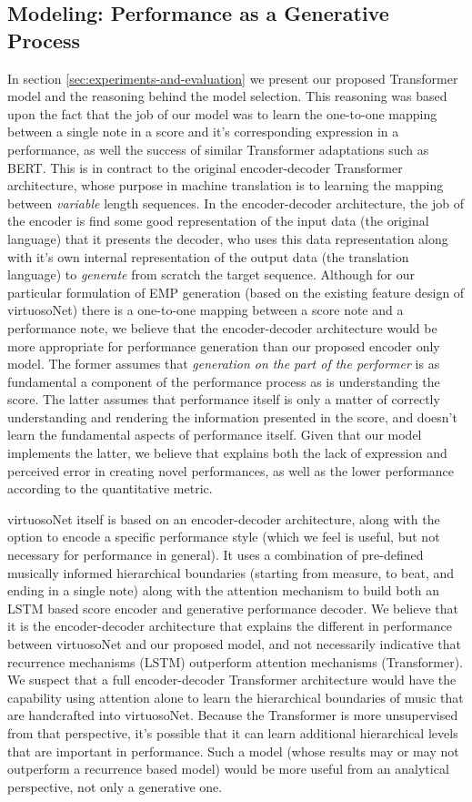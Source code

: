 \subsection{Modeling: Performance as a Generative Process}
In section \ref{sec:experiments-and-evaluation} we present our proposed Transformer model and the reasoning behind the model selection. This reasoning was based upon the fact that the job of our model was to learn the one-to-one mapping between a single note in a score and it's corresponding expression in a performance, as well the success of similar Transformer adaptations such as BERT\cite{devlin2018bert}. This is in contract to the original encoder-decoder Transformer architecture, whose purpose in machine translation is to learning the mapping between \emph{variable} length sequences. In the encoder-decoder architecture, the job of the encoder is find some good representation of the input data (the original language) that it presents the decoder, who uses this data representation along with it's own internal representation of the output data (the translation language) to \emph{generate} from scratch the target sequence. Although for our particular formulation of EMP generation (based on the existing feature design of virtuosoNet) there is a one-to-one mapping between a score note and a performance note, we believe that the encoder-decoder architecture would be more appropriate for performance generation than our proposed encoder only model. The former assumes that \emph{generation on the part of the performer} is as fundamental a component of the performance process as is understanding the score. The latter assumes that performance itself is only a matter of correctly understanding and rendering the information presented in the score, and doesn't learn the fundamental aspects of performance itself. Given that our model implements the latter, we believe that explains both the lack of expression and perceived error in creating novel performances, as well as the lower performance according to the quantitative metric. 

virtuosoNet itself is based on an encoder-decoder architecture, along with the option to encode a specific performance style (which we feel is useful, but not necessary for performance in general). It uses a combination of pre-defined musically informed hierarchical boundaries (starting from measure, to beat, and ending in a single note) along with the attention mechanism to build both an LSTM based score encoder and generative performance decoder. We believe that it is the encoder-decoder architecture that explains the different in performance between virtuosoNet and our proposed model, and not necessarily indicative that recurrence mechanisms (LSTM) outperform attention mechanisms (Transformer). We suspect that a full encoder-decoder Transformer architecture would have the capability using attention alone to learn the hierarchical boundaries of music that are handcrafted into virtuosoNet. Because the Transformer is more unsupervised from that perspective, it's possible that it can learn additional hierarchical levels that are important in performance. Such a model (whose results may or may not outperform a recurrence based model) would be more useful from an analytical perspective, not only a generative one.  

